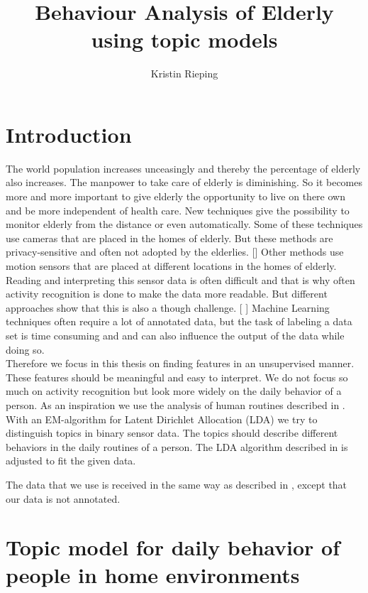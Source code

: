 \documentclass[11pt,a4paper]{article}
\title{Behaviour Analysis of Elderly using topic models}
\author{Kristin Rieping}
\begin{document}
\maketitle
\section{Introduction}
The world population increases unceasingly and thereby the percentage of elderly also increases. The manpower to take care of elderly is diminishing. So it becomes more and more important to give elderly the opportunity to live on there own and be more independent of health care.
New techniques give the possibility to monitor elderly from the distance or even automatically. Some of these techniques use cameras that are placed in the homes of elderly. But these methods are privacy-sensitive and often not adopted by the elderlies. []
Other methods use motion sensors that are placed at different locations in the homes of elderly. 
Reading and interpreting this sensor data is often difficult and that is why often activity recognition is done to make the data more readable. But different approaches show that this is also a though challenge. [ ]
Machine Learning techniques often require a lot of annotated data, but the task of labeling a data set is time consuming and and can also influence the output of the data while doing so.\\
Therefore we focus in this thesis on finding features in an unsupervised manner. These features should be meaningful and easy to interpret. We do not focus so much on activity recognition but look more widely on the daily behavior of a person. As an inspiration we use the analysis of human routines described in \cite{farrahi2008daily} .  With an EM-algorithm for Latent Dirichlet Allocation (LDA) we try to distinguish topics in binary sensor data. The topics should describe different behaviors in the daily routines of a person. The LDA algorithm described in  \cite{blei2003latent}  is adjusted to fit the given data.

The data that we use is received in the same way as described in \cite{van2010activity}, except that our data is not annotated.
\section{Topic model for daily behavior of people in home environments}
\end{document}
